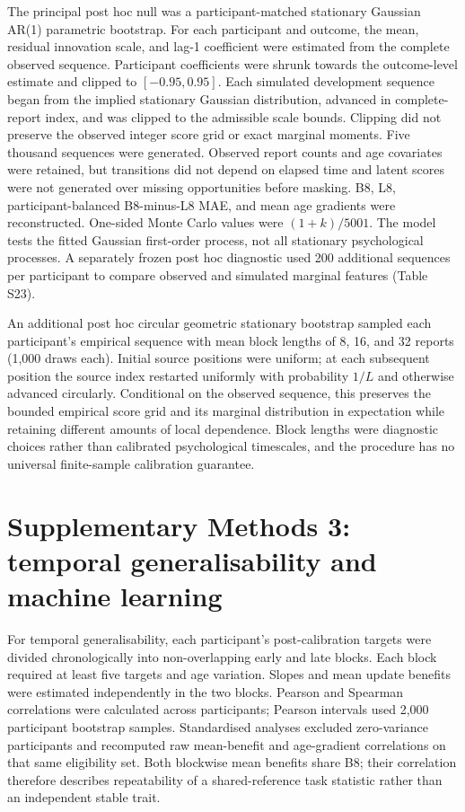 \documentclass[pdflatex,sn-vancouver-num]{sn-jnl}
\begin{document}
The principal post hoc null was a participant-matched stationary Gaussian AR(1) parametric bootstrap. For each participant and outcome, the mean, residual innovation scale, and lag-1 coefficient were estimated from the complete observed sequence. Participant coefficients were shrunk towards the outcome-level estimate and clipped to $[-0.95,0.95]$. Each simulated development sequence began from the implied stationary Gaussian distribution, advanced in complete-report index, and was clipped to the admissible scale bounds. Clipping did not preserve the observed integer score grid or exact marginal moments. Five thousand sequences were generated. Observed report counts and age covariates were retained, but transitions did not depend on elapsed time and latent scores were not generated over missing opportunities before masking. B8, L8, participant-balanced B8-minus-L8 MAE, and mean age gradients were reconstructed. One-sided Monte Carlo values were $(1+k)/5001$. The model tests the fitted Gaussian first-order process, not all stationary psychological processes. A separately frozen post hoc diagnostic used 200 additional sequences per participant to compare observed and simulated marginal features (Table S23).

An additional post hoc circular geometric stationary bootstrap sampled each participant's empirical sequence with mean block lengths of 8, 16, and 32 reports (1,000 draws each). Initial source positions were uniform; at each subsequent position the source index restarted uniformly with probability $1/L$ and otherwise advanced circularly. Conditional on the observed sequence, this preserves the bounded empirical score grid and its marginal distribution in expectation while retaining different amounts of local dependence. Block lengths were diagnostic choices rather than calibrated psychological timescales, and the procedure has no universal finite-sample calibration guarantee.

\section{Supplementary Methods 3: temporal generalisability and machine learning}

For temporal generalisability, each participant's post-calibration targets were divided chronologically into non-overlapping early and late blocks. Each block required at least five targets and age variation. Slopes and mean update benefits were estimated independently in the two blocks. Pearson and Spearman correlations were calculated across participants; Pearson intervals used 2,000 participant bootstrap samples. Standardised analyses excluded zero-variance participants and recomputed raw mean-benefit and age-gradient correlations on that same eligibility set. Both blockwise mean benefits share B8; their correlation therefore describes repeatability of a shared-reference task statistic rather than an independent stable trait.
\end{document}
